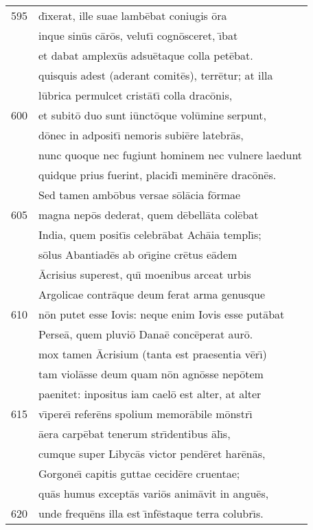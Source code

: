 \documentclass[paper=6in:9in,pagesize=pdftex,
               headinclude=on,footinclude=on,12pt]{scrbook}
\begin{document}
\begin{longtable}[p]{ r l }
595 & d\={\i}xerat, ille suae lamb\=ebat coniugis \=ora\\ 
 & inque sin\=us c\=ar\=os, velut\={\i} cogn\=osceret, \={\i}bat\\ 
 & et dabat amplex\=us adsu\=etaque colla pet\=ebat.\\ 
 & quisquis adest (aderant comit\=es), terr\=etur; at illa\\ 
 & l\=ubrica permulcet crist\=at\={\i} colla drac\=onis,\\ 
600 & et subit\=o duo sunt i\=unct\=oque vol\=umine serpunt,\\ 
 & d\=onec in adposit\={\i} nemoris subi\=ere latebr\=as,\\ 
 & nunc quoque nec fugiunt hominem nec vulnere laedunt\\ 
 & quidque prius fuerint, placid\={\i} memin\=ere drac\=on\=es.\\ 
 & \indent Sed tamen amb\=obus versae s\=ol\=acia f\=ormae\\ 
605 & magna nep\=os dederat, quem d\=ebell\=ata col\=ebat\\ 
 & India, quem posit\={\i}s celebr\=abat Ach\=aia templ\={\i}s;\\ 
 & s\=olus Abantiad\=es ab or\={\i}gine cr\=etus e\=adem\\ 
 & \=Acrisius superest, qu\={\i} moenibus arceat urbis\\ 
 & Argolicae contr\=aque deum ferat arma genusque\\ 
610 & n\=on putet esse Iovis: neque enim Iovis esse put\=abat\\ 
 & Perse\=a, quem pluvi\=o Dana\=e conc\=eperat aur\=o.\\ 
 & mox tamen \=Acrisium (tanta est praesentia v\=er\={\i})\\ 
 & tam viol\=asse deum quam n\=on agn\=osse nep\=otem\\ 
 & paenitet: inpositus iam cael\=o est alter, at alter\\ 
615 & v\={\i}pere\={\i} refer\=ens spolium memor\=abile m\=onstr\={\i}\\ 
 & \=aera carp\=ebat tenerum str\={\i}dentibus \=al\={\i}s,\\ 
 & cumque super Libyc\=as victor pend\=eret har\=en\=as,\\ 
 & Gorgone\={\i} capitis guttae cecid\=ere cruentae;\\ 
 & qu\=as humus except\=as vari\=os anim\=avit in angu\=es,\\ 
620 & unde frequ\=ens illa est \={\i}nf\=estaque terra colubr\={\i}s.\\ 

\end{longtable}
\end{document}
